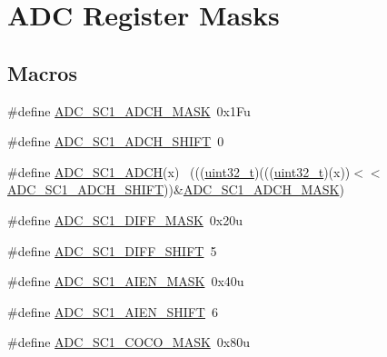 \hypertarget{group___a_d_c___register___masks}{}\section{A\+DC Register Masks}
\label{group___a_d_c___register___masks}
\subsection*{Macros}
\begin{DoxyCompactItemize}
\item 
\#define \hyperlink{group___a_d_c___register___masks_ga7450ced3c2b2df20023c2152f1470640}{A\+D\+C\+\_\+\+S\+C1\+\_\+\+A\+D\+C\+H\+\_\+\+M\+A\+SK}~0x1\+Fu
\item 
\#define \hyperlink{group___a_d_c___register___masks_gab2ba46d5132224f2920c1881e2c1b6fe}{A\+D\+C\+\_\+\+S\+C1\+\_\+\+A\+D\+C\+H\+\_\+\+S\+H\+I\+FT}~0
\item 
\#define \hyperlink{group___a_d_c___register___masks_ga84ca57710a5589aed16fdd78629a1105}{A\+D\+C\+\_\+\+S\+C1\+\_\+\+A\+D\+CH}(x)                                                ~(((\hyperlink{_p_e___types_8h_a33594304e786b158f3fb30289278f5af}{uint32\+\_\+t})(((\hyperlink{_p_e___types_8h_a33594304e786b158f3fb30289278f5af}{uint32\+\_\+t})(x))$<$$<$\hyperlink{group___a_d_c___register___masks_gab2ba46d5132224f2920c1881e2c1b6fe}{A\+D\+C\+\_\+\+S\+C1\+\_\+\+A\+D\+C\+H\+\_\+\+S\+H\+I\+FT}))\&\hyperlink{group___a_d_c___register___masks_ga7450ced3c2b2df20023c2152f1470640}{A\+D\+C\+\_\+\+S\+C1\+\_\+\+A\+D\+C\+H\+\_\+\+M\+A\+SK})
\item 
\#define \hyperlink{group___a_d_c___register___masks_gadc514fb491cf08eb3fb0f27298388645}{A\+D\+C\+\_\+\+S\+C1\+\_\+\+D\+I\+F\+F\+\_\+\+M\+A\+SK}~0x20u
\item 
\#define \hyperlink{group___a_d_c___register___masks_ga1385c936a9440856068dcb917ed9c658}{A\+D\+C\+\_\+\+S\+C1\+\_\+\+D\+I\+F\+F\+\_\+\+S\+H\+I\+FT}~5
\item 
\#define \hyperlink{group___a_d_c___register___masks_gaa698d898e077003de10a42184de8f124}{A\+D\+C\+\_\+\+S\+C1\+\_\+\+A\+I\+E\+N\+\_\+\+M\+A\+SK}~0x40u
\item 
\#define \hyperlink{group___a_d_c___register___masks_gaf2cde8fb207dd348e6313d6d0a5b3761}{A\+D\+C\+\_\+\+S\+C1\+\_\+\+A\+I\+E\+N\+\_\+\+S\+H\+I\+FT}~6
\item 
\#define \hyperlink{group___a_d_c___register___masks_ga698a3a178a5b412febc8c0cc849e8896}{A\+D\+C\+\_\+\+S\+C1\+\_\+\+C\+O\+C\+O\+\_\+\+M\+A\+SK}~0x80u
$$
\end{DoxyCompactItemize}
